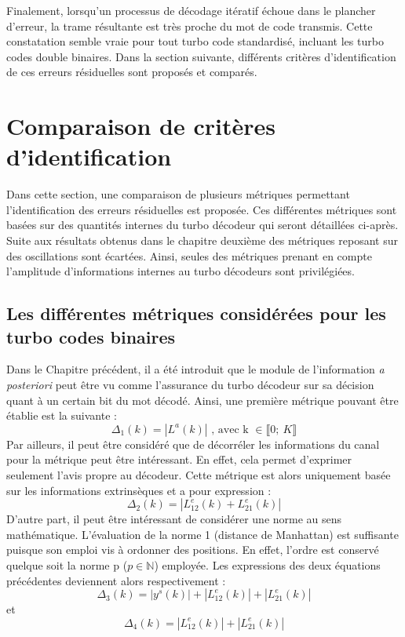 Finalement, lorsqu'un processus de décodage itératif échoue dans le plancher d'erreur, la trame résultante est très proche du 
mot de code transmis. Cette constatation semble vraie pour tout turbo code standardisé, incluant les turbo codes
double binaires. Dans la section suivante, différents critères d'identification de ces erreurs résiduelles sont 
proposés et comparés.
\newpage
\section{Comparaison de critères d'identification}
Dans cette section, une comparaison de plusieurs métriques permettant l'identification des erreurs résiduelles est 
proposée. Ces différentes métriques sont basées sur des quantités internes du turbo décodeur qui seront détaillées ci-après.\\
Suite aux résultats obtenus dans le chapitre deuxième des métriques reposant sur des oscillations sont écartées. Ainsi, 
seules des métriques prenant en compte l'amplitude d'informations internes au turbo décodeurs sont privilégiées.

\subsection{Les différentes métriques considérées pour les turbo codes binaires}
Dans le Chapitre précédent, il a été introduit que le module de l'information \textit{a posteriori} peut être vu comme 
l'assurance du turbo décodeur sur sa décision quant à un certain bit du mot décodé. Ainsi, une première métrique pouvant 
être établie est la suivante :
\begin{equation}
	\Delta_1(k) = |L^a(k)|\text{~, avec k~}\in \llbracket0;~K \rrbracket 
\end{equation}
Par ailleurs, il peut être considéré que de décorréler les informations du canal pour la métrique peut être intéressant. En effet, 
cela permet d'exprimer seulement l'avis propre au décodeur. Cette métrique est alors uniquement basée sur les informations 
extrinsèques et a pour expression : 
\begin{equation}
	\Delta_2(k) = |L^e_{12}(k)+L^e_{21}(k)|
\end{equation}
D'autre part, il peut être intéressant de considérer une norme au sens mathématique. L'évaluation de la norme 1 
(distance de Manhattan) est suffisante puisque son emploi vis à ordonner des positions. En effet, l'ordre est 
conservé quelque soit la norme p ($p \in \mathbb{N} $) employée. Les expressions des deux équations précédentes deviennent 
alors respectivement :
\begin{equation}
	\Delta_3(k) = |y^s(k)| + |L^e_{12}(k)| + |L^e_{21}(k)|
\end{equation}
et 
\begin{equation}
	\Delta_4(k) = |L^e_{12}(k)| + |L^e_{21}(k)|
\end{equation}

